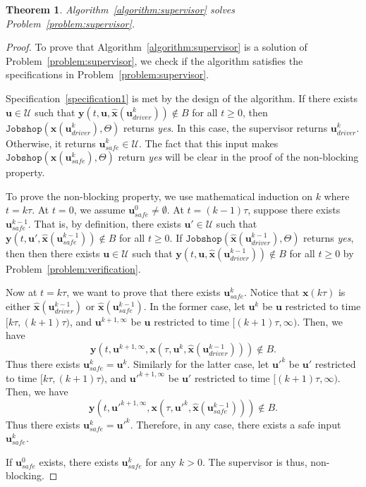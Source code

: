 \documentclass{sig-alternate}
\newtheorem{theorem}{Theorem}
\begin{document}
\begin{theorem}
	Algorithm~\ref{algorithm:supervisor} solves Problem~\ref{problem:supervisor}.
\end{theorem}
\begin{proof}
	To prove that Algorithm~\ref{algorithm:supervisor} is a solution of Problem~\ref{problem:supervisor}, we check if the algorithm satisfies the specifications in Problem~\ref{problem:supervisor}.
	
	Specification~\ref{specification1} is met by the design of the algorithm. If there exists $\mathbf{u}\in\mathcal{U}$ such that $\mathbf{y}(t,\mathbf{u},\hat{\mathbf{x}}(\mathbf{u}_{driver}^k))\notin B$ for all $t\geq 0$, then $\mathtt{Jobshop}(\hat{\mathbf{x}}(\mathbf{u}_{driver}^k),\Theta)$ returns \textit{yes}. In this case, the supervisor returns $\mathbf{u}_{driver}^k$. Otherwise, it returns $\mathbf{u}_{safe}^k\in\mathcal{U}$. The fact that this input makes $\mathtt{Jobshop}(\hat{\mathbf{x}}(\mathbf{u}_{safe}^k),\Theta)$ return \textit{yes} will be clear in the proof of the non-blocking property. 
	
	To prove the non-blocking property, we use mathematical induction on $k$ where $t=k\tau$. At $t=0$, we assume $\mathbf{u}_{safe}^0 \neq \emptyset$. At $t=(k-1)\tau$, suppose there exists $\mathbf{u}_{safe}^{k-1}$. That is, by definition, there exists $\mathbf{u}'\in\mathcal{U}$ such that $\mathbf{y}(t,\mathbf{u}',\hat{\mathbf{x}}(\mathbf{u}_{safe}^{k-1}))\notin B$ for all $t\geq 0$. If $\mathtt{Jobshop}(\hat{\mathbf{x}}(\mathbf{u}_{driver}^{k-1}),\Theta)$ returns \textit{yes}, then then there exists $\mathbf{u}\in\mathcal{U}$ such that $\mathbf{y}(t,\mathbf{u},\hat{\mathbf{x}}(\mathbf{u}_{driver}^{k-1}))\notin B$ for all $t\geq 0$ by Problem~\ref{problem:verification}. 
	
	Now at $t=k\tau$, we want to prove that there exists $\mathbf{u}_{safe}^k$. Notice that $\mathbf{x}(k\tau)$ is either $\hat{\mathbf{x}}(\mathbf{u}_{driver}^{k-1})$ or $\hat{\mathbf{x}}(\mathbf{u}_{safe}^{k-1})$. In the former case, let $\mathbf{u}^{k}$ be $\mathbf{u}$ restricted to time $[k\tau, (k+1)\tau)$, and $\mathbf{u}^{k+1,\infty}$ be $\mathbf{u}$ restricted to time $[(k+1)\tau, \infty)$. Then, we have $$\mathbf{y}(t,\mathbf{u}^{k+1,\infty},{\mathbf{x}}(\tau,\mathbf{u}^k,\hat{\mathbf{x}}(\mathbf{u}_{driver}^{k-1})))\notin B.$$ Thus there exists $\mathbf{u}_{safe}^k = \mathbf{u}^k$. Similarly for the latter case, let $\mathbf{u}'^k$ be $\mathbf{u}'$ restricted to time $[k\tau, (k+1)\tau)$, and $\mathbf{u}'^{k+1,\infty}$ be $\mathbf{u}'$ restricted to time $[(k+1)\tau,\infty)$. Then, we have
	$$\mathbf{y}(t,\mathbf{u}'^{k+1,\infty},\mathbf{x}(\tau,\mathbf{u}'^k,\hat{\mathbf{x}}(\mathbf{u}_{safe}^{k-1})))\notin B.$$ Thus there exists $\mathbf{u}_{safe}^k = \mathbf{u}'^k$. Therefore, in any case, there exists a safe input $\mathbf{u}_{safe}^k$.
	
	If $\mathbf{u}_{safe}^0$ exists, there exists $\mathbf{u}_{safe}^k$ for any $k>0$. The supervisor is thus, non-blocking.
	\end{proof}
\end{document}
